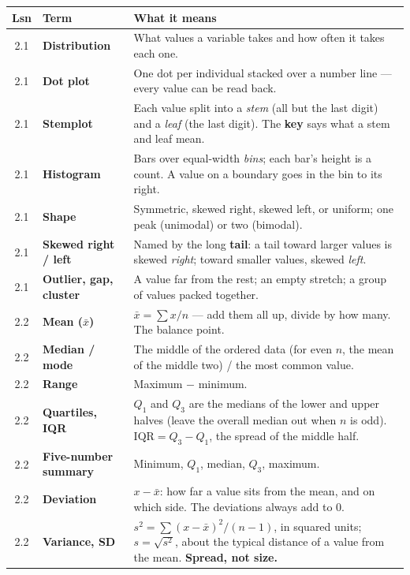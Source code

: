 \documentclass[10pt]{article}
\begin{document}
\vspace{3pt}
\renewcommand{\arraystretch}{1.2}
\begin{tabularx}{\linewidth}{@{} c >{\raggedright\bfseries}p{3.3cm} X @{}}
\rowcolor{frost}
\textbf{Lsn} & \textbf{Term} & \textbf{What it means} \\
\midrule
2.1 & Distribution & What values a variable takes and how often it takes each one. \\
2.1 & Dot plot & One dot per individual stacked over a number line --- every value can be
      read back. \\
2.1 & Stemplot & Each value split into a \emph{stem} (all but the last digit) and a
      \emph{leaf} (the last digit). The \textbf{key} says what a stem and leaf mean. \\
2.1 & Histogram & Bars over equal-width \emph{bins}; each bar's height is a count. A value on
      a boundary goes in the bin to its right. \\
2.1 & Shape & Symmetric, skewed right, skewed left, or uniform; one peak (unimodal) or two
      (bimodal). \\
2.1 & Skewed right / left & Named by the long \textbf{tail}: a tail toward larger values is
      skewed \emph{right}; toward smaller values, skewed \emph{left}. \\
2.1 & Outlier, gap, cluster & A value far from the rest; an empty stretch; a group of values
      packed together. \\
2.2 & Mean ($\bar{x}$) & $\bar{x} = \sum x / n$ --- add them all up, divide by how many. The
      balance point. \\
2.2 & Median / mode & The middle of the ordered data (for even $n$, the mean of the middle
      two) / the most common value. \\
2.2 & Range & Maximum $-$ minimum. \\
2.2 & Quartiles, IQR & $Q_1$ and $Q_3$ are the medians of the lower and upper halves (leave
      the overall median out when $n$ is odd). $\text{IQR} = Q_3 - Q_1$, the spread of the
      middle half. \\
2.2 & Five-number summary & Minimum, $Q_1$, median, $Q_3$, maximum. \\
2.2 & Deviation & $x - \bar{x}$: how far a value sits from the mean, and on which side. The
      deviations always add to $0$. \\
2.2 & Variance, SD & $s^2 = \sum (x - \bar{x})^2 / (n - 1)$, in squared units; $s = \sqrt{s^2}$,
      about the typical distance of a value from the mean. \textbf{Spread, not size.} \\
\end{tabularx}
\end{document}
